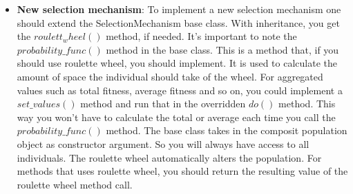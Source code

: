 \begin{itemize}
\item \textbf{New selection mechanism}: To implement a new selection mechanism one should extend the SelectionMechanism base class. With inheritance, you get the $roulett_wheel()$ method, if needed. It's important to note the $probability\_func()$ method in the base class. This is a method that, if you should use roulette wheel, you should implement. It is used to calculate the amount of space the individual should take of the wheel. For aggregated values such as total fitness, average fitness and so on, you could implement a $set\_values()$ method and run that in the overridden $do()$ method. This way you won't have to calculate the total or average each time you call the $probability\_func()$ method. The base class takes in the composit population object as constructor argument. So you will always have access to all individuals. The roulette wheel automatically alters the population. For methods that uses roulette wheel, you should return the resulting value of the roulette wheel method call. 

\end{itemize}
